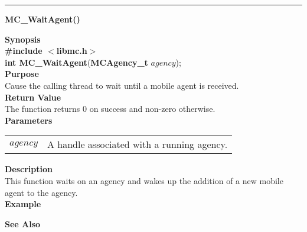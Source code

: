 \noindent
\vspace{5pt}
\rule{6.5in}{0.015in}
\noindent
{\LARGE \bf MC\_WaitAgent()}\\
{}

\noindent
{\bf Synopsis}\\
{\bf \#include $<$libmc.h$>$}\\
{\bf int MC\_WaitAgent}({\bf MCAgency\_t} $agency$);\\

\noindent
{\bf Purpose}\\
Cause the calling thread to wait until a mobile agent is received.\\

\noindent
{\bf Return Value}\\
The function returns 0 on success and non-zero otherwise.\\

\noindent
{\bf Parameters}
\vspace{-0.1in}
\begin{description}
\item               
\begin{tabular}{p{10 mm}p{145 mm}}
$agency$ & A handle associated with a running agency. 
\end{tabular}
\end{description}

\noindent
{\bf Description}\\
This function waits on an agency and wakes up the addition of a new
mobile agent to the agency.\\

\noindent
{\bf Example}\\
\noindent

\noindent
{\bf See Also}\\

